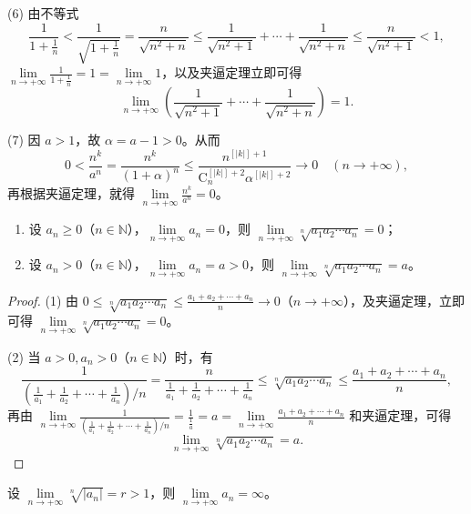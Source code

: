 \begin{solution}
(6) 由不等式
\[
\frac{1}{1+\frac{1}{n}} < \frac{1}{\sqrt{1+\frac{1}{n}}} = \frac{n}{\sqrt{n^{2}+n}} \leqslant \frac{1}{\sqrt{n^{2}+1}}+\cdots+\frac{1}{\sqrt{n^{2}+n}} \leqslant \frac{n}{\sqrt{n^{2}+1}} < 1,
\]
$\lim\limits_{n\to+\infty}\frac{1}{1+\frac{1}{n}} = 1 = \lim\limits_{n\to+\infty}1$，以及夹逼定理立即可得
\[
\lim_{n\to+\infty}\left(\frac{1}{\sqrt{n^2+1}}+\cdots+\frac{1}{\sqrt{n^2+n}}\right) = 1.
\]

(7) 因 $a>1$，故 $\alpha = a-1 > 0$。从而
\[
0 < \frac{n^{k}}{a^{n}} = \frac{n^{k}}{(1+\alpha)^{n}} \leqslant \frac{n^{[|k|]+1}}{\mathrm{C}_{n}^{[|k|]+2}\alpha^{[|k|]+2}} \to 0\quad (n\to+\infty),
\]
再根据夹逼定理，就得 $\lim\limits_{n\to+\infty}\frac{n^k}{a^n} = 0$。
\end{solution}

\begin{example}\label{ex:1.2.6}
\begin{enumerate}
  \item 设 $a_{n} \geqslant 0$（$n \in \mathbb{N}$），$\lim\limits_{n \to +\infty} a_{n} = 0$，则 $\lim\limits_{n \to +\infty} \sqrt[n]{a_1 a_2 \cdots a_n} = 0$；
  \item 设 $a_n > 0$（$n \in \mathbb{N}$），$\lim\limits_{n \to +\infty} a_n = a > 0$，则 $\lim\limits_{n \to +\infty} \sqrt[n]{a_1 a_2 \cdots a_n} = a$。
\end{enumerate}
\end{example}

\begin{proof}
(1) 由 $0 \leqslant \sqrt[n]{a_1 a_2 \cdots a_n} \leqslant \frac{a_1 + a_2 + \cdots + a_n}{n} \to 0$（$n \to +\infty$），及夹逼定理，立即可得 $\lim\limits_{n \to +\infty} \sqrt[n]{a_1 a_2 \cdots a_n} = 0$。

(2) 当 $a>0, a_{n}>0$（$n\in\mathbb{N}$）时，有
\[
\frac{1}{\left(\frac{1}{a_{1}}+\frac{1}{a_{2}}+\cdots+\frac{1}{a_{n}}\right)/n} = \frac{n}{\frac{1}{a_{1}}+\frac{1}{a_{2}}+\cdots+\frac{1}{a_{n}}} \leqslant \sqrt[n]{a_{1}a_{2}\cdots a_{n}} \leqslant \frac{a_{1}+a_{2}+\cdots+a_{n}}{n},
\]
再由 $\lim\limits_{n\to+\infty}\frac{1}{\left(\frac{1}{a_1}+\frac{1}{a_2}+\cdots+\frac{1}{a_n}\right)/n} = \frac{1}{\frac{1}{a}} = a = \lim\limits_{n\to+\infty}\frac{a_1+a_2+\cdots+a_n}{n}$ 和夹逼定理，可得
\[
\lim_{n\to+\infty}\sqrt[n]{a_{1}a_{2}\cdots a_{n}} = a.
\]
\end{proof}

\begin{example}\label{ex:1.2.7}
设 $\lim\limits_{n\to+\infty}\sqrt[n]{|a_n|}=r>1$，则 $\lim\limits_{n\to+\infty}a_n=\infty$。
\end{example}

